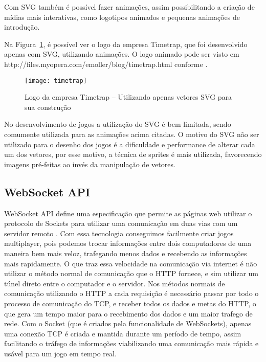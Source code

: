 Com SVG também é possível fazer animações, assim possibilitando a
criação de mídias mais interativas, como logotipos animados e pequenas
animações de introdução.

Na Figura~\ref{img:timetrap}, é possível ver o logo da empresa
Timetrap, que foi desenvolvido apenas com SVG, utilizando animações. O
logo animado pode ser visto em
http://files.myopera.com/emoller/blog/timetrap.html conforme
\cite{website:svgtimetrap}.

\begin{figure}[H]
  \centering
	\texttt{[image: timetrap]}
  \caption{Logo da empresa Timetrap {--} Utilizando apenas vetores SVG para sua construção}
  \label{img:timetrap}
\end{figure}

No desenvolvimento de jogos a utilização do SVG é bem limitada, sendo
comumente utilizada para as animações acima citadas. O motivo do SVG
não ser utilizado para o desenho dos jogos é a dificuldade e
performance de alterar cada um dos vetores, por esse motivo,
a técnica de sprites é mais utilizada, favorecendo imagens pré-feitas
ao invés da manipulação de vetores.


\subsection{WebSocket API}

WebSocket API define uma especificação que permite as páginas web
utilizar o protocolo de Sockets para utilizar uma comunicação em duas
vias com um servidor remoto \cite{website:w3cwebsockets}. Com essa tecnologia
conseguimos facilmente criar jogos multiplayer, pois podemos
trocar informações entre dois computadores de uma maneira bem mais
veloz, trafegando menos dados e recebendo as informações mais
rapidamente.
O que traz essa velocidade na comunicação via internet é não utilizar
o método normal de comunicação que o HTTP fornece, e sim utilizar um
túnel direto entre o computador e o servidor.
Nos métodos normais de comunicação utilizando o HTTP a cada requisição
é necessário passar por todo o processo de comunicação do TCP, e
receber todos os dados e metas do HTTP, o que gera um tempo maior para
o recebimento dos dados e um maior trafego de rede. Com o Socket (que
é criados pela funcionalidade de WebSockets), apenas uma conexão TCP é
criada e mantida durante um período de tempo, assim facilitando o
tráfego de informações viabilizando uma comunicação mais rápida e
usável para um jogo em tempo real.


